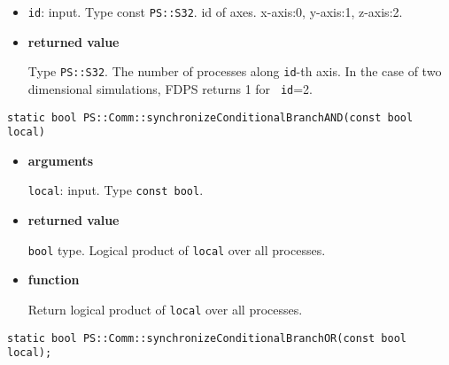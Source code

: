 \begin{itemize}

\item{\bf }

{\tt id}: input. Type const {\tt PS::S32}. id of axes. x-axis:0,
y-axis:1, z-axis:2.


\item{\bf returned value}

Type {\tt PS::S32}. The number of processes along {\tt id}-th axis.
In the case of two dimensional simulations, FDPS returns 1 for {\tt
id}=2.


\end{itemize}


\begin{screen}
\begin{verbatim}
static bool PS::Comm::synchronizeConditionalBranchAND(const bool local)
\end{verbatim}
\end{screen}

\begin{itemize}

\item{\bf arguments}

{\tt local}: input. Type {\tt const bool}.


\item{\bf returned value}

{\tt bool} type. Logical product of {\tt local} over all processes.

\item{\bf function}

Return logical product of {\tt local} over all processes.

\end{itemize}


\begin{screen}
\begin{verbatim}
static bool PS::Comm::synchronizeConditionalBranchOR(const bool local);
\end{verbatim}
\end{screen}


